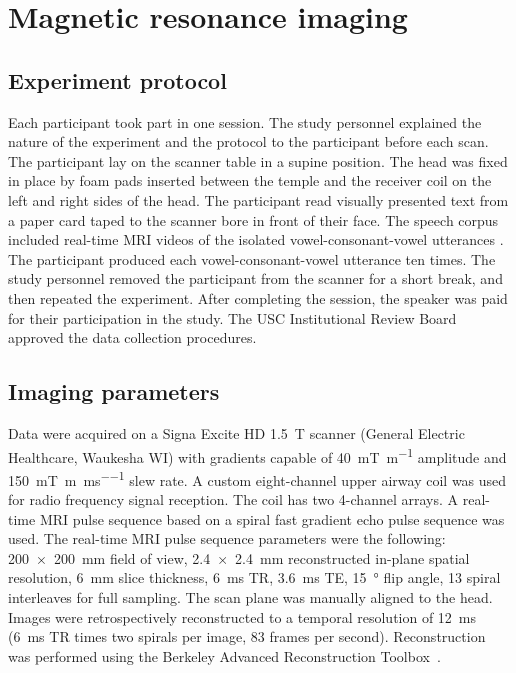 \documentclass[preprint]{JASAnew}\usepackage[]{graphicx}\usepackage[]{color}
\begin{document}
\section{Magnetic resonance imaging}
\label{sec:mri}

\subsection{Experiment protocol}

Each participant took part in one session. The study personnel explained the nature of the experiment and the protocol to the participant before each scan. The participant lay on the scanner table in a supine position. The head was fixed in place by foam pads inserted between the temple and the receiver coil on the left and right sides of the head. The participant read visually presented text from a paper card taped to the scanner bore in front of their face. The speech corpus included real-time MRI videos of the isolated vowel-consonant-vowel utterances \textipa{[apa], [ata], [aka], [aja]}. The participant produced each vowel-consonant-vowel utterance ten times. The study personnel removed the participant from the scanner for a short break, and then repeated the experiment. After completing the session, the speaker was paid for their participation in the study. The USC Institutional Review Board approved the data collection procedures. 




\subsection{Imaging parameters}

Data were acquired on a Signa Excite HD \SI{1.5}{\tesla} scanner (General Electric Healthcare, Waukesha WI) with gradients capable of \SI[per-mode=symbol]{40}{\milli\tesla\per\meter} amplitude and \SI[per-mode=repeated-symbol]{150}{\milli\tesla\per\meter\per\milli\second} slew rate. A custom eight-channel upper airway coil was used for radio frequency signal reception. The coil has two 4-channel arrays. 
%
A real-time MRI pulse sequence based on a spiral fast gradient echo pulse sequence was used. 
%
The real-time MRI pulse sequence parameters were the following: 
%
\SI{200 x 200}{\milli\meter} field of view, 
\SI{2.4 x 2.4}{\milli\meter} reconstructed in-plane spatial resolution, 
\SI{6}{\milli\meter} slice thickness,
\SI{6}{\milli\second} TR,
\SI{3.6}{\milli\second} TE,
\SI{15}{\degree} flip angle,
\num{13} spiral interleaves for full sampling.
%
The scan plane was manually aligned to the head. 
%
Images were retrospectively reconstructed to a temporal resolution of \SI{12}{\milli\second} (\SI{6}{\milli\second} TR times two spirals per image, 83 frames per second). 
%
Reconstruction was performed using the Berkeley Advanced Reconstruction Toolbox~\citep{uecker2015berkeley}.
\end{document}
